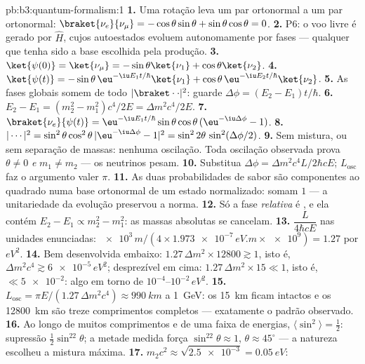 \begin{solution}{pb:b3:quantum-formalism:1}
\textbf{1.} Uma rotação leva um par ortonormal a um par ortonormal:
$\braket{\nu_e}{\nu_\mu} = -\cos\theta\sin\theta +
\sin\theta\cos\theta = 0$.
\textbf{2.} P6: o voo livre é gerado por $\hat H$, cujos autoestados
evoluem autonomamente por fases --- qualquer que tenha sido a base
escolhida pela produção.
\textbf{3.} $\ket{\psi(0)} = \ket{\nu_\mu} = -\sin\theta\ket{\nu_1}
+ \cos\theta\ket{\nu_2}$.
\textbf{4.} $\ket{\psi(t)} = -\sin\theta\,\eu^{-\iu E_1t/\hbar}
\ket{\nu_1} + \cos\theta\,\eu^{-\iu E_2t/\hbar}\ket{\nu_2}$.
\textbf{5.} As fases globais somem de todo $|\braket\cdot\cdot|^2$:
guarde $\Delta\phi = (E_2 - E_1)t/\hbar$.
\textbf{6.} $E_2 - E_1 = (m_2^2 - m_1^2)c^4/2E = \Delta m^2c^4/2E$.
\textbf{7.} $\braket{\nu_e}{\psi(t)} = \eu^{-\iu E_1t/\hbar}
\sin\theta\cos\theta\,(\eu^{-\iu\Delta\phi} - 1)$.
\textbf{8.} $|\cdots|^2 = \sin^2\theta\cos^2\theta\,|{\eu^{-\iu
\Delta\phi} - 1}|^2 = \sin^22\theta\,\sin^2(\Delta\phi/2)$.
\textbf{9.} Sem mistura, ou sem separação de massas: nenhuma
oscilação. Toda oscilação observada prova $\theta \neq 0$ \emph{e} $m_1 \neq
m_2$ --- os neutrinos pesam.
\textbf{10.} Substitua $\Delta\phi = \Delta m^2c^4L/2\hbar cE$;
$L_{\text{osc}}$ faz o argumento valer $\pi$.
\textbf{11.} As duas probabilidades de sabor são componentes ao
quadrado numa base ortonormal de um estado normalizado: somam $1$ ---
a unitariedade da evolução preservou a norma.
\textbf{12.} Só a fase \emph{relativa} é , e ela contém
$E_2 - E_1 \propto m_2^2 - m_1^2$: as massas absolutas se cancelam.
\textbf{13.} $\dfrac{L}{4\hbar cE}$ nas unidades enunciadas:
$\num{e3}\,\unit{m}/(4 \times \num{1.973e-7}\,\unit{eV.m} \times
\num{e9}) = 1.27$ por $\unit{eV^2}$.
\textbf{14.} Bem desenvolvida embaixo: $1.27\,\Delta m^2 \times 12800
\gtrsim 1$, isto é, $\Delta m^2c^4 \gtrsim \num{6e-5}\,\unit{eV^2}$;
desprezível em cima: $1.27\,\Delta m^2 \times 15 \ll 1$, isto é, $\ll
\num{5e-2}$: algo em torno de $10^{-4}$--$10^{-2}\,\unit{eV^2}$.
\textbf{15.} $L_{\text{osc}} = \pi E/(1.27\,\Delta m^2c^4) \approx
\qty{990}{km}$ a \qty{1}{GeV}: os \qty{15}{km} ficam intactos e os
\qty{12800}{km} são treze comprimentos completos --- exatamente o
padrão observado.
\textbf{16.} Ao longo de muitos comprimentos e de uma faixa de
energias, $\langle\sin^2\rangle = \tfrac12$: supressão
$\tfrac12\sin^22
\theta$; a metade medida força $\sin^22\theta \approx 1$,
$\theta \approx 45^\circ$ --- a natureza escolheu a mistura máxima.
\textbf{17.} $m_2c^2 \approx \sqrt{\num{2.5e-3}} = \qty{0.05}{eV}$:

\end{solution}
